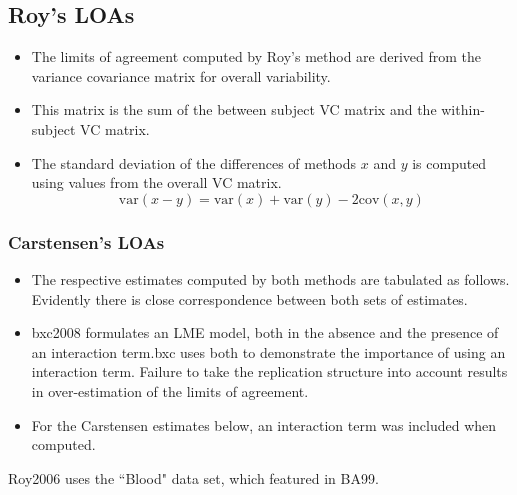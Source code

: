 \documentclass[compress]{beamer}        %
\begin{document}
\subsection{Roy's LOAs}
\begin{frame}
\begin{itemize}
\item The limits of agreement computed by Roy's method are derived from the variance covariance matrix for overall variability.
\item This matrix is the sum of the between subject VC matrix and the within-subject VC matrix.
\item
The standard deviation of the differences of methods $x$ and $y$ is computed using values from the overall VC matrix.
\[
\mbox{var}(x - y ) = \mbox{var} ( x )  + \mbox{var} ( y ) - 2\mbox{cov} ( x ,y )
\]
\end{itemize}
\end{frame}
\begin{frame}
\frametitle{Carstensen's LOAs}
\large
\begin{itemize}
\item The respective estimates computed by both methods are tabulated as follows. Evidently there is close correspondence between both sets of estimates.

\item \alert{bxc2008} formulates an LME model, both in the absence and the presence of an interaction term.\alert{bxc} uses both to demonstrate the importance of using an interaction term. Failure to take the replication structure into
account results in over-estimation of the limits of agreement. 
\item For the Carstensen estimates below, an interaction term was included when computed.
\end{itemize}
\end{frame}
\begin{frame}

\alert{Roy2006} uses the ``Blood" data set, which featured in \alert{BA99}.

\end{frame}
\end{document}
